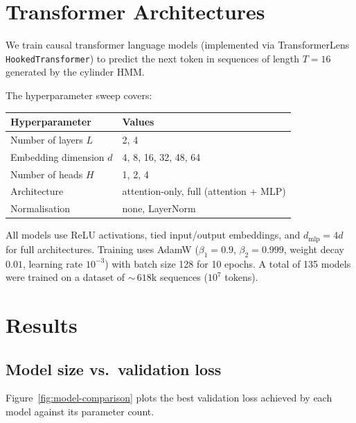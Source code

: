 \documentclass[11pt]{article}
\begin{document}
\section{Transformer Architectures}\label{sec:transformers}

We train causal transformer language models (implemented via TransformerLens \texttt{HookedTransformer}) to predict the next token in sequences of length $T = 16$ generated by the cylinder HMM\@.

The hyperparameter sweep covers:
\begin{center}
\begin{tabular}{ll}
  \toprule
  Hyperparameter & Values \\
  \midrule
  Number of layers $L$        & 2, 4 \\
  Embedding dimension $d$     & 4, 8, 16, 32, 48, 64 \\
  Number of heads $H$         & 1, 2, 4 \\
  Architecture                & attention-only, full (attention + MLP) \\
  Normalisation               & none, LayerNorm \\
  \bottomrule
\end{tabular}
\end{center}
All models use ReLU activations, tied input/output embeddings, and $d_{\mathrm{mlp}} = 4d$ for full architectures.  Training uses AdamW ($\beta_1 = 0.9$, $\beta_2 = 0.999$, weight decay $0.01$, learning rate $10^{-3}$) with batch size 128 for 10 epochs.  A total of 135 models were trained on a dataset of ${\sim}\,618\text{k}$ sequences ($10^7$ tokens).

\section{Results}\label{sec:results}

\subsection{Model size vs.\ validation loss}

Figure~\ref{fig:model-comparison} plots the best validation loss achieved by each model against its parameter count.
\end{document}

